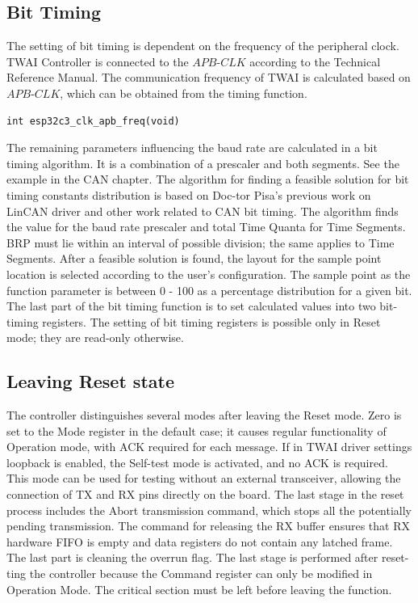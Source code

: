 \documentclass{ctuthesis}
\begin{document}
 \subsection{Bit Timing}
 The setting of bit timing is dependent on the frequency of the peripheral clock. TWAI Controller is connected to the $APB\text{-}CLK$ according to the Technical Reference Manual. The communication frequency of TWAI is calculated based on $APB\text{-}CLK$, which can be obtained from the timing function.
\begin{verbatim}
int esp32c3_clk_apb_freq(void)
\end{verbatim}
 The remaining parameters influencing the baud rate are calculated in a bit timing algorithm. It is a combination of a prescaler and both segments. See the example in the CAN chapter. The algorithm for finding a feasible solution for bit timing constants distribution is based on Doc-tor Pisa's previous work on LinCAN driver and other work related to CAN bit timing. The algorithm finds the value for the baud rate prescaler and total Time Quanta for Time Segments. BRP must lie within an interval of possible division; the same applies to Time Segments. After a feasible solution is found, the layout for the sample point location is selected according to the user's configuration. The sample point as the function parameter is between 0 - 100 as a percentage distribution for a given bit. The last part of the bit timing function is to set calculated values into two bit-timing registers. The setting of bit timing registers is possible only in Reset mode; they are read-only otherwise.
 
 \subsection{Leaving Reset state}
 The controller distinguishes several modes after leaving the Reset mode. Zero is set to the Mode register in the default case; it causes regular functionality of Operation mode, with ACK required for each message. If in TWAI driver settings loopback is enabled, the Self-test mode is activated, and no ACK is required. This mode can be used for testing without an external transceiver, allowing the connection of TX and RX pins directly on the board. The last stage in the reset process includes the Abort transmission command, which stops all the potentially pending transmission. The command for releasing the RX buffer ensures that RX hardware FIFO is empty and data registers do not contain any latched frame. The last part is cleaning the overrun flag. The last stage is performed after reset-ting the controller because the Command register can only be modified in Operation Mode. The critical section must be left before leaving the function.
 
\end{document}
